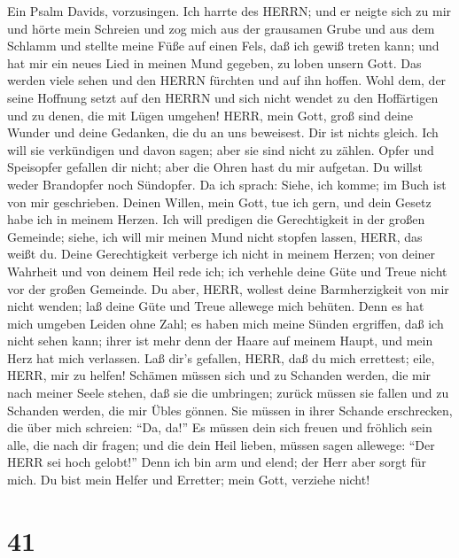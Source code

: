  Ein Psalm Davids, vorzusingen. Ich harrte des HERRN; und er
neigte sich zu mir und hörte mein Schreien  und zog mich aus
der grausamen Grube und aus dem Schlamm und stellte meine Füße auf einen
Fels, daß ich gewiß treten kann;  und hat mir ein neues Lied
in meinen Mund gegeben, zu loben unsern Gott. Das werden viele sehen und
den HERRN fürchten und auf ihn hoffen.  Wohl dem, der seine
Hoffnung setzt auf den HERRN und sich nicht wendet zu den Hoffärtigen
und zu denen, die mit Lügen umgehen!  HERR, mein Gott, groß
sind deine Wunder und deine Gedanken, die du an uns beweisest. Dir ist
nichts gleich. Ich will sie verkündigen und davon sagen; aber sie sind
nicht zu zählen.  Opfer und Speisopfer gefallen dir nicht;
aber die Ohren hast du mir aufgetan. Du willst weder Brandopfer noch
Sündopfer.  Da ich sprach: Siehe, ich komme; im Buch ist von
mir geschrieben.  Deinen Willen, mein Gott, tue ich gern,
und dein Gesetz habe ich in meinem Herzen.  Ich will
predigen die Gerechtigkeit in der großen Gemeinde; siehe, ich will mir
meinen Mund nicht stopfen lassen, HERR, das weißt du. 
Deine Gerechtigkeit verberge ich nicht in meinem Herzen; von deiner
Wahrheit und von deinem Heil rede ich; ich verhehle deine Güte und Treue
nicht vor der großen Gemeinde.  Du aber, HERR, wollest
deine Barmherzigkeit von mir nicht wenden; laß deine Güte und Treue
allewege mich behüten.  Denn es hat mich umgeben Leiden
ohne Zahl; es haben mich meine Sünden ergriffen, daß ich nicht sehen
kann; ihrer ist mehr denn der Haare auf meinem Haupt, und mein Herz hat
mich verlassen.  Laß dir's gefallen, HERR, daß du mich
errettest; eile, HERR, mir zu helfen!  Schämen müssen sich
und zu Schanden werden, die mir nach meiner Seele stehen, daß sie die
umbringen; zurück müssen sie fallen und zu Schanden werden, die mir
Übles gönnen.  Sie müssen in ihrer Schande erschrecken, die
über mich schreien: ``Da, da!''  Es müssen dein sich freuen
und fröhlich sein alle, die nach dir fragen; und die dein Heil lieben,
müssen sagen allewege: ``Der HERR sei hoch gelobt!''  Denn
ich bin arm und elend; der Herr aber sorgt für mich. Du bist mein Helfer
und Erretter; mein Gott, verziehe nicht!

\hypertarget{section-40}{%
\section{41}\label{section-40}}

